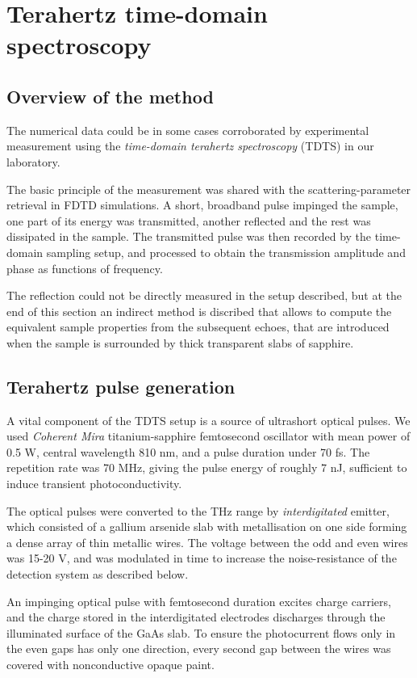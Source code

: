 \section{Terahertz time-domain spectroscopy}
\subsection{Overview of the method}%
The numerical data could be in some cases corroborated by experimental measurement using the \textit{time-domain terahertz spectroscopy} (TDTS) in our laboratory. 

The basic principle of the measurement was shared with the scattering-parameter retrieval in FDTD simulations. %
 A short, broadband pulse impinged the sample, one part of its energy was transmitted, another reflected and the rest was dissipated in the sample. The transmitted pulse was then recorded by the time-domain sampling setup, and processed to obtain the transmission amplitude and phase as functions of frequency.

The reflection could not be directly measured in the setup described, but at the end of this section an indirect method is discribed that allows to compute the equivalent sample properties from the subsequent echoes, that are introduced when the sample is surrounded by thick transparent slabs of sapphire. 
\subsection{Terahertz pulse generation}%
A vital component of the TDTS setup is a source of ultrashort optical pulses. 
We used \textit{Coherent Mira} titanium-sapphire femtosecond oscillator with mean power of 0.5 W, central wavelength 810 nm, and a pulse duration under 70 fs.  %
The repetition rate was 70 MHz, giving the pulse energy of roughly 7 nJ, sufficient to induce transient photoconductivity.

The optical pulses were converted to the THz range by \textit{interdigitated} emitter, which consisted of a gallium arsenide slab %
with metallisation on one side forming a dense array of thin metallic wires. The voltage between the odd and even wires was 15-20 V, and was modulated in time to increase the noise-resistance of the detection system as described below.

An impinging optical pulse with femtosecond duration excites charge carriers, and the charge stored in the interdigitated electrodes discharges through the illuminated surface %
of the GaAs slab. To ensure the photocurrent flows only in the even gaps has only one direction, every second gap between the wires was covered with nonconductive opaque paint.

